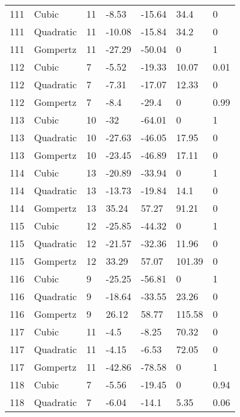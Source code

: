 \documentclass[11pt]{article}
\begin{document}
\begin{center}
\begin{longtable}{lllllll}
    111 & Cubic     & 11              & -8.53   & -15.64  & 34.4    & 0    \\
    111 & Quadratic & 11              & -10.08  & -15.84  & 34.2    & 0    \\
    111 & Gompertz  & 11              & -27.29  & -50.04  & 0       & 1    \\
    112 & Cubic     & 7               & -5.52   & -19.33  & 10.07   & 0.01 \\
    112 & Quadratic & 7               & -7.31   & -17.07  & 12.33   & 0    \\
    112 & Gompertz  & 7               & -8.4    & -29.4   & 0       & 0.99 \\
    113 & Cubic     & 10              & -32     & -64.01  & 0       & 1    \\
    113 & Quadratic & 10              & -27.63  & -46.05  & 17.95   & 0    \\
    113 & Gompertz  & 10              & -23.45  & -46.89  & 17.11   & 0    \\
    114 & Cubic     & 13              & -20.89  & -33.94  & 0       & 1    \\
    114 & Quadratic & 13              & -13.73  & -19.84  & 14.1    & 0    \\
    114 & Gompertz  & 13              & 35.24   & 57.27   & 91.21   & 0    \\
    115 & Cubic     & 12              & -25.85  & -44.32  & 0       & 1    \\
    115 & Quadratic & 12              & -21.57  & -32.36  & 11.96   & 0    \\
    115 & Gompertz  & 12              & 33.29   & 57.07   & 101.39  & 0    \\
    116 & Cubic     & 9               & -25.25  & -56.81  & 0       & 1    \\
    116 & Quadratic & 9               & -18.64  & -33.55  & 23.26   & 0    \\
    116 & Gompertz  & 9               & 26.12   & 58.77   & 115.58  & 0    \\
    117 & Cubic     & 11              & -4.5    & -8.25   & 70.32   & 0    \\
    117 & Quadratic & 11              & -4.15   & -6.53   & 72.05   & 0    \\
    117 & Gompertz  & 11              & -42.86  & -78.58  & 0       & 1    \\
    118 & Cubic     & 7               & -5.56   & -19.45  & 0       & 0.94 \\
    118 & Quadratic & 7               & -6.04   & -14.1   & 5.35    & 0.06 \\

\end{longtable}
\end{center}
\end{document}
